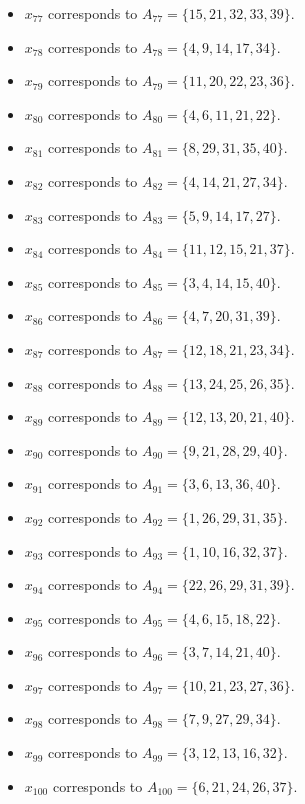 \documentclass[11pt]{article}
\begin{document}
\begin{itemize}
\item $x_{77}$ corresponds to $A_{77}=\{15, 21, 32, 33, 39\}$.
\item $x_{78}$ corresponds to $A_{78}=\{4, 9, 14, 17, 34\}$.
\item $x_{79}$ corresponds to $A_{79}=\{11, 20, 22, 23, 36\}$.
\item $x_{80}$ corresponds to $A_{80}=\{4, 6, 11, 21, 22\}$.
\item $x_{81}$ corresponds to $A_{81}=\{8, 29, 31, 35, 40\}$.
\item $x_{82}$ corresponds to $A_{82}=\{4, 14, 21, 27, 34\}$.
\item $x_{83}$ corresponds to $A_{83}=\{5, 9, 14, 17, 27\}$.
\item $x_{84}$ corresponds to $A_{84}=\{11, 12, 15, 21, 37\}$.
\item $x_{85}$ corresponds to $A_{85}=\{3, 4, 14, 15, 40\}$.
\item $x_{86}$ corresponds to $A_{86}=\{4, 7, 20, 31, 39\}$.
\item $x_{87}$ corresponds to $A_{87}=\{12, 18, 21, 23, 34\}$.
\item $x_{88}$ corresponds to $A_{88}=\{13, 24, 25, 26, 35\}$.
\item $x_{89}$ corresponds to $A_{89}=\{12, 13, 20, 21, 40\}$.
\item $x_{90}$ corresponds to $A_{90}=\{9, 21, 28, 29, 40\}$.
\item $x_{91}$ corresponds to $A_{91}=\{3, 6, 13, 36, 40\}$.
\item $x_{92}$ corresponds to $A_{92}=\{1, 26, 29, 31, 35\}$.
\item $x_{93}$ corresponds to $A_{93}=\{1, 10, 16, 32, 37\}$.
\item $x_{94}$ corresponds to $A_{94}=\{22, 26, 29, 31, 39\}$.
\item $x_{95}$ corresponds to $A_{95}=\{4, 6, 15, 18, 22\}$.
\item $x_{96}$ corresponds to $A_{96}=\{3, 7, 14, 21, 40\}$.
\item $x_{97}$ corresponds to $A_{97}=\{10, 21, 23, 27, 36\}$.
\item $x_{98}$ corresponds to $A_{98}=\{7, 9, 27, 29, 34\}$.
\item $x_{99}$ corresponds to $A_{99}=\{3, 12, 13, 16, 32\}$.
\item $x_{100}$ corresponds to $A_{100}=\{6, 21, 24, 26, 37\}$.
\end{itemize}
\end{document}

